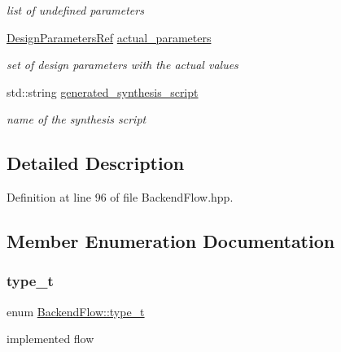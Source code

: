 \begin{DoxyCompactItemize}
\begin{DoxyCompactList}\small\item\em list of undefined parameters \end{DoxyCompactList}\item 
\hyperlink{DesignParameters_8hpp_ae36bb1c4c9150d0eeecfe1f96f42d157}{Design\+Parameters\+Ref} \hyperlink{classBackendFlow_a880b32084d564aa2e072088175270031}{actual\+\_\+parameters}
\begin{DoxyCompactList}\small\item\em set of design parameters with the actual values \end{DoxyCompactList}\item 
std\+::string \hyperlink{classBackendFlow_a0be96e8ee5a80e06b2d5e1760e541fc7}{generated\+\_\+synthesis\+\_\+script}
\begin{DoxyCompactList}\small\item\em name of the synthesis script \end{DoxyCompactList}\end{DoxyCompactItemize}


\subsection{Detailed Description}


Definition at line 96 of file Backend\+Flow.\+hpp.



\subsection{Member Enumeration Documentation}
\mbox{\label{classBackendFlow_ac342772f1d3890eb1aad9a8de911da08}} 
\subsubsection{\texorpdfstring{type\+\_\+t}{type\_t}}
{\footnotesize\ttfamily enum \hyperlink{classBackendFlow_ac342772f1d3890eb1aad9a8de911da08}{Backend\+Flow\+::type\+\_\+t}}



implemented flow 

